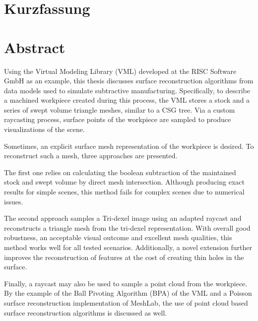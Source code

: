 \chapter*{Kurzfassung}


\pagebreak

\chapter*{Abstract}

Using the Virtual Modeling Library (VML) developed at the RISC Software GmbH as an example, this thesis discusses surface reconstruction algorithms from data models used to simulate subtractive manufacturing.
Specifically, to describe a machined workpiece created during this process, the VML stores a stock and a series of swept volume triangle meshes, similar to a CSG tree.
Via a custom raycasting process, surface points of the workpiece are sampled to produce visualizations of the scene.

Sometimes, an explicit surface mesh representation of the workpiece is desired.
To reconstruct such a mesh, three approaches are presented.

The first one relies on calculating the boolean subtraction of the maintained stock and swept volume by direct mesh intersection.
Although producing exact results for simple scenes, this method fails for complex scenes due to numerical issues.

The second approach samples a Tri-dexel image using an adapted raycast and reconstructs a triangle mesh from the tri-dexel representation.
With overall good robustness, an acceptable visual outcome and excellent mesh qualities, this method works well for all tested scenarios.
Additionally, a novel extension further improves the reconstruction of features at the cost of creating thin holes in the surface.

Finally, a raycast may also be used to sample a point cloud from the workpiece.
By the example of the Ball Pivoting Algorithm (BPA) of the VML and a Poisson surface reconstruction implementation of MeshLab, the use of point cloud based surface reconstruction algorithms is discussed as well.
